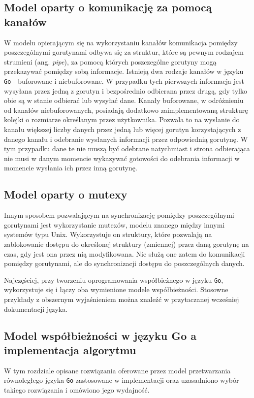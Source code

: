 \subsection{Model oparty o komunikację za pomocą kanałów}

W modelu opierającym się na wykorzystaniu kanałów komunikacja pomiędzy poszczególnymi gorutynami odbywa się za struktur, które są pewnym rodzajem strumieni (ang. \textit{pipe}), za pomocą których poszczególne gorutyny mogą przekazywać pomiędzy sobą informacje. Istnieją dwa rodzaje kanałów w języku \texttt{Go} - buforowane i niebuforowane. W przypadku tych pierwszych informacja jest wysyłana przez jedną z gorutyn i bezpośrednio odbierana przez drugą, gdy tylko obie są w stanie odbierać lub wysyłać dane. Kanały buforowane, w odróżnieniu od kanałów niebuforowanych, posiadają dodatkowo zaimplementowaną strukturę kolejki o rozmiarze określanym przez użytkownika. Pozwala to na wysłanie do kanału większej liczby danych przez jedną lub więcej gorutyn korzystających z danego kanału i odebranie wysłanych informacji przez odpowiednią gorutynę. W tym przypadku dane te nie muszą być odebrane natychmiast i strona odbierająca nie musi w danym momencie wykazywać gotowości do odebrania informacji w momencie wysłania ich przez inną gorutynę.

\subsection{Model oparty o mutexy}
Innym sposobem pozwalającym na synchronizację pomiędzy poszczególnymi gorutynami jest wykorzystanie mutexów, modelu znanego między innymi systemów typu Unix. Wykorzystuje on struktury, które pozwalają na zablokowanie dostępu do określonej struktury (zmiennej) przez daną gorutynę na czas, gdy jest ona przez nią modyfikowana. Nie służą one zatem do komunikacji pomiędzy gorutynami, ale do synchronizacji dostępu do poszczególnych danych. 

Najczęściej, przy tworzeniu oprogramowania współbieżnego w języku \texttt{Go}, wykorzystuje się i łączy oba wymienione modele współbieżności. Stosowne przykłady z obszernym wyjaśnieniem można znaleźć w przytaczanej wcześniej dokumentacji języka.

\subsection{Model współbieżności w języku Go a implementacja algorytmu}

W tym rozdziale opisane rozwiązania oferowane przez model przetwarzania równoległego języka \texttt{Go} zastosowane w implementacji oraz uzasadniono wybór takiego rozwiązania i omówiono jego wydajność.

